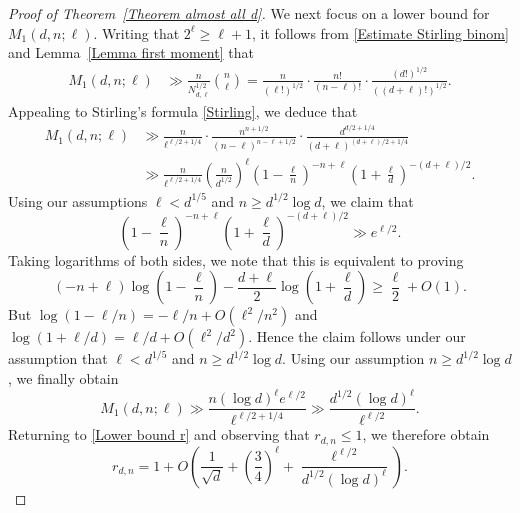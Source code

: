 \documentclass[11pt, reqno]{amsart}
\numberwithin{equation}{section}
\renewcommand{\leq}{\leqslant}
\renewcommand{\geq}{\geqslant}
\begin{document}
\begin{proof}[Proof of Theorem~\ref{Theorem almost all d}]
We next focus on a lower bound for $M_1(d,n;\ell)$.
Writing that $2^{\ell} \geq \ell+1$, 
it follows from \eqref{Estimate Stirling binom} and 
Lemma~\ref{Lemma first moment}  that
\begin{align*}
M_1(d,n;\ell) & \gg \frac{n}{N_{d,\ell}^{1/2}} \binom{n}{\ell} 
 = \frac{n}{(\ell!)^{1/2}} \cdot \frac{n!}{(n-\ell)!} \cdot \frac{(d!)^{1/2}}{((d+\ell)!)^{1/2}}.
\end{align*}
Appealing to Stirling's formula \eqref{Stirling}, we deduce that
\begin{align*}
M_1(d,n;\ell) & \gg \frac{n}{\ell^{\ell/2+1/4}
} \cdot \frac{n^{n+1/2}}{(n-\ell)^{n-\ell+1/2} } \cdot \frac{d^{d/2+1/4}}{(d+\ell)^{(d+\ell)/2+1/4}} \\
& \gg 
\frac{n}{\ell^{\ell/2+1/4}}
\left( \frac{n}{d^{1/2}} \right)^{\ell} \left(1-\frac{\ell}{n} \right)^{-n+\ell}  \left(1+\frac{\ell}{d} \right)^{-(d+\ell)/2}.
\end{align*}
Using our assumptions $\ell < d^{1/5}$ and $n \geq d^{1/2}\log d$,  we claim that 
\begin{equation*}
\left(1-\frac{\ell}{n} \right)^{-n+\ell} \left(1+\frac{\ell}{d} \right)^{-(d+\ell)/2} \gg e^{\ell/2}.
\end{equation*}
Taking logarithms of both sides, we note that this  is equivalent to proving 
$$
(-n+\ell) \log\left(1-\frac{\ell}{n}\right) - \frac{d+\ell}{2} \log\left(1+\frac{\ell}{d}\right) \geq \frac{\ell}{2}+O(1).
$$
But $\log(1-\ell/n)=-\ell/n+O(\ell^2/n^2)$ and 
$\log(1+\ell/d)=\ell/d+O(\ell^2/d^2)$. Hence the claim follows under our assumption that 
$\ell < d^{1/5}$ and $n \geq d^{1/2}\log d$.
Using  our assumption $n \geq d^{1/2}\log d$, we finally obtain
\begin{equation*}
M_1(d,n;\ell) \gg 
\frac{n 
(\log d)^{\ell}
e^{\ell/2}}{\ell^{\ell/2+1/4}}\gg 
\frac{d^{1/2}
(\log d)^\ell}{\ell^{\ell/2}}.
\end{equation*}
Returning to 
\eqref{Lower bound r} and observing that $r_{d,n}\leq 1$, we therefore obtain
\begin{equation}\label{eq:shone}
r_{d,n} =1+ O \left( \frac1{\sqrt{d}}+\left(\frac{3}{4}\right)^\ell+
\frac{\ell^{\ell/2}}{d^{1/2}
{(\log d)^{\ell}}}
 \right) .
\end{equation}



\end{proof}
\end{document}
